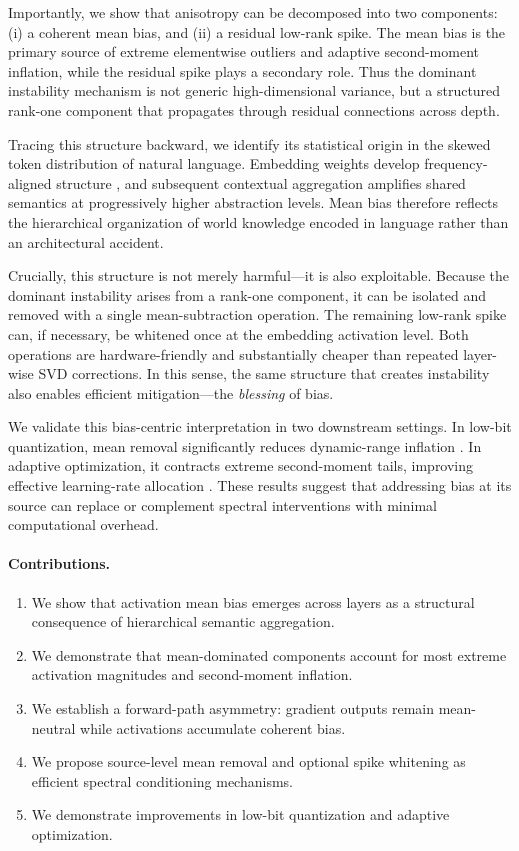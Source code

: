 Importantly, we show that anisotropy can be decomposed into two components:
(i) a coherent mean bias, and
(ii) a residual low-rank spike.
The mean bias is the primary source of extreme elementwise outliers
and adaptive second-moment inflation,
while the residual spike plays a secondary role.
Thus the dominant instability mechanism is not generic high-dimensional variance,
but a structured rank-one component that propagates through residual connections
across depth.

Tracing this structure backward,
we identify its statistical origin in the skewed token distribution of natural language.
Embedding weights develop frequency-aligned structure
\cite{mikolov2013efficient,mikolov2013distributed,arora2017simple},
and subsequent contextual aggregation amplifies shared semantics at progressively
higher abstraction levels.
Mean bias therefore reflects the hierarchical organization of world knowledge
encoded in language rather than an architectural accident.

Crucially, this structure is not merely harmful—it is also exploitable.
Because the dominant instability arises from a rank-one component,
it can be isolated and removed with a single mean-subtraction operation.
The remaining low-rank spike can, if necessary,
be whitened once at the embedding activation level.
Both operations are hardware-friendly and substantially cheaper
than repeated layer-wise SVD corrections.
In this sense, the same structure that creates instability
also enables efficient mitigation—the \emph{blessing} of bias.

We validate this bias-centric interpretation in two downstream settings.
In low-bit quantization, mean removal significantly reduces dynamic-range inflation
\cite{xiao2023smoothquant,wei2023outlier,ashkboos2024quarot}.
In adaptive optimization, it contracts extreme second-moment tails,
improving effective learning-rate allocation
\cite{kingma2014adam,spectra2026}.
These results suggest that addressing bias at its source
can replace or complement spectral interventions
with minimal computational overhead.

\paragraph{Contributions.}
\begin{enumerate}[leftmargin=*,itemsep=2pt]
    \item We show that activation mean bias emerges across layers as a structural consequence of hierarchical semantic aggregation.
    \item We demonstrate that mean-dominated components account for most extreme activation magnitudes and second-moment inflation.
    \item We establish a forward-path asymmetry: gradient outputs remain mean-neutral while activations accumulate coherent bias.
    \item We propose source-level mean removal and optional spike whitening as efficient spectral conditioning mechanisms.
    \item We demonstrate improvements in low-bit quantization and adaptive optimization.
\end{enumerate}